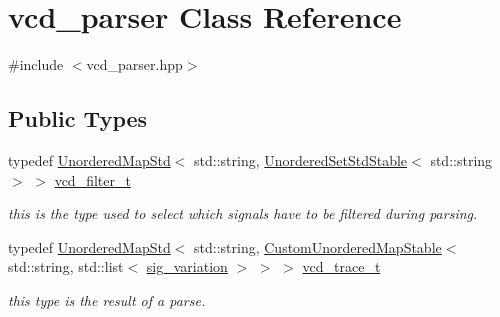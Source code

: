 \hypertarget{classvcd__parser}{}\section{vcd\+\_\+parser Class Reference}
\label{classvcd__parser}


{\ttfamily \#include $<$vcd\+\_\+parser.\+hpp$>$}

\subsection*{Public Types}
\begin{DoxyCompactItemize}
\item 
typedef \hyperlink{custom__map_8hpp_af22b2f058635373912f810498e5b1052}{Unordered\+Map\+Std}$<$ std\+::string, \hyperlink{custom__set_8hpp_a1f63d303cef2790dc0a0ff7feae38f83}{Unordered\+Set\+Std\+Stable}$<$ std\+::string $>$ $>$ \hyperlink{classvcd__parser_a00f10dd896fdc534014c6192eed18d55}{vcd\+\_\+filter\+\_\+t}
\begin{DoxyCompactList}\small\item\em this is the type used to select which signals have to be filtered during parsing. \end{DoxyCompactList}\item 
typedef \hyperlink{custom__map_8hpp_af22b2f058635373912f810498e5b1052}{Unordered\+Map\+Std}$<$ std\+::string, \hyperlink{custom__map_8hpp_a7314a7df1cdb3a3acf478ab86e95c226}{Custom\+Unordered\+Map\+Stable}$<$ std\+::string, std\+::list$<$ \hyperlink{structsig__variation}{sig\+\_\+variation} $>$ $>$ $>$ \hyperlink{classvcd__parser_a84b85cb9df5165fca362a9da87c5a02f}{vcd\+\_\+trace\+\_\+t}
\begin{DoxyCompactList}\small\item\em this type is the result of a parse. \end{DoxyCompactList}\end{DoxyCompactItemize}
